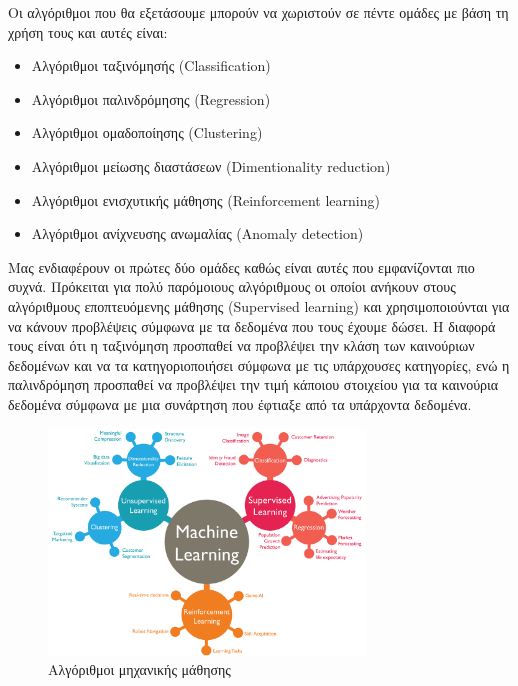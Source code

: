 Οι αλγόριθμοι που θα εξετάσουμε μπορούν να χωριστούν σε πέντε
ομάδες με βάση τη χρήση τους και αυτές είναι:
\begin{itemize}
    \item Αλγόριθμοι ταξινόμησής (\textlatin{Classification})
    \item Αλγόριθμοι παλινδρόμησης (\textlatin{Regression})
    \item Αλγόριθμοι ομαδοποίησης (\textlatin{Clustering})
    \item Αλγόριθμοι μείωσης διαστάσεων (\textlatin{Dimentionality reduction})
    \item Αλγόριθμοι ενισχυτικής μάθησης (\textlatin{Reinforcement learning})
    \item Αλγόριθμοι ανίχνευσης ανωμαλίας (\textlatin{Anomaly detection})
\end{itemize}
Μας ενδιαφέρουν οι πρώτες δύο ομάδες καθώς είναι αυτές που
εμφανίζονται πιο συχνά. Πρόκειται για πολύ παρόμοιους
αλγόριθμους οι οποίοι ανήκουν στους αλγόριθμους εποπτευόμενης
μάθησης (\textlatin{Supervised learning}) και χρησιμοποιούνται
για να κάνουν προβλέψεις σύμφωνα με τα δεδομένα που τους έχουμε
δώσει. Η διαφορά τους είναι ότι η ταξινόμηση προσπαθεί να 
προβλέψει την κλάση των καινούριων δεδομένων και να τα 
κατηγοριοποιήσει σύμφωνα με τις υπάρχουσες κατηγορίες, ενώ η 
παλινδρόμηση προσπαθεί να προβλέψει την τιμή κάποιου στοιχείου 
για τα καινούρια δεδομένα σύμφωνα με μια συνάρτηση που έφτιαξε
από τα υπάρχοντα δεδομένα.
\begin{figure}[H]
    \centering
    \includegraphics[width=0.75\textwidth]{images/machineLearning.png}
    \caption{Αλγόριθμοι μηχανικής μάθησης}
\end{figure}